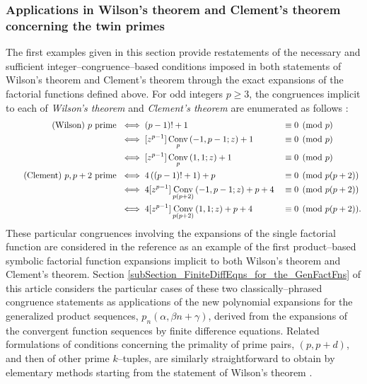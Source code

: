 \documentclass[12pt,reqno]{article}
\numberwithin{sfootnote}{section}
\numberwithin{equation}{section}
\theoremstyle{DefaultTheoremStyle}
\theoremstyle{definition}
\newcommand{\pn}[3]{\ensuremath{p_{#1}\left(#2, #3\right)}}
\newcommand{\ConvGF}[4]{\ensuremath{\Conv_{#1}\left(#2, #3; #4\right)}}
\DeclareMathOperator{\Conv}{Conv}
\begin{document}
\subsubsection{Applications in Wilson's theorem and 
               Clement's theorem concerning the twin primes} 
The first examples given in this section provide restatements of the 
necessary and sufficient integer--congruence--based conditions 
imposed in both statements of Wilson's theorem and Clement's theorem 
through the exact expansions of the factorial functions defined above. 
For odd integers $p \geq 3$, the congruences 
implicit to each of \emph{Wilson's theorem} and \emph{Clement's theorem} 
are enumerated as follows 
\citep[\S 4.3]{PRIMEREC} \citep[\S 6.6]{HARDYWRIGHTNUMT} \citep{CLEMENTPRIMES}: 
\begin{align} 
\tag{Wilson} 
\text{ $p$ prime } & \iff (p-1)! + 1 && \equiv 0 \pmod{p} \\ 
\notag 
   & \iff 
     [z^{p-1}] \ConvGF{p}{-1}{p-1}{z} + 1 && \equiv 0 \pmod{p} \\ 
\notag 
   & \iff 
     [z^{p-1}] \ConvGF{p}{1}{1}{z} + 1 && \equiv 0 \pmod{p} \\ 
\tag{Clement} 
\text{ $p, p+2$ prime } & \iff 
     4\left((p-1)! + 1\right) + p && \equiv 0 \pmod{p(p+2)} \\ 
\notag 
   & \iff 
     4 [z^{p-1}] \ConvGF{p(p+2)}{-1}{p-1}{z} + p + 4 && \equiv 0 \pmod{p(p+2)} \\ 
\notag 
   & \iff 
     4 [z^{p-1}] \ConvGF{p(p+2)}{1}{1}{z} + p + 4 && \equiv 0 \pmod{p(p+2)}. 
\end{align} 
These particular congruences involving the expansions of the 
single factorial function are considered in the reference 
\citep[\S 6.1.6]{MULTIFACTJIS} as an example of the 
first product--based symbolic factorial function expansions implicit to both 
Wilson's theorem and Clement's theorem. 
Section \ref{subSection_FiniteDiffEqns_for_the_GenFactFns} 
of this article considers the particular cases of 
these two classically--phrased congruence statements as 
applications of the new polynomial expansions for the 
generalized product sequences, $\pn{n}{\alpha}{\beta n+\gamma}$, 
derived from the expansions of the 
convergent function sequences by finite difference equations. 
Related formulations of conditions concerning the 
primality of prime pairs, $(p, p+d)$, and then of 
other prime $k$--tuples, 
are similarly straightforward to obtain by elementary methods 
starting from the statement of Wilson's theorem 
\citep{ONWTHM-AND-POLIGNAC-CONJ}. 
\end{document}
